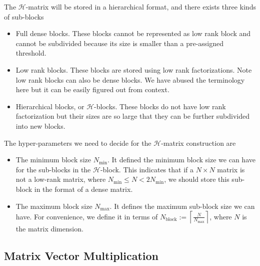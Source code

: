 \documentclass[3p,,preprint,12pt]{elsarticle}
\theoremstyle{definition}
\begin{document}
The $\mathcal{H}$-matrix will be stored in a hierarchical format, and there exists three kinds of sub-blocks
\begin{itemize}
	\item Full dense blocks. These blocks cannot be represented as low rank block and cannot be subdivided because its size is smaller than a pre-assigned threshold.
	\item Low rank blocks. These blocks are stored using low rank factorizations. Note low rank blocks can also be dense blocks. We have abused the terminology here but it can be easily figured out from context.
	\item Hierarchical blocks, or $\mathcal{H}$-blocks. These blocks do not have low rank factorization but their sizes are so large that they can be further subdivided into new blocks.
\end{itemize}
The hyper-parameters we need to decide for the $\mathcal{H}$-matrix construction are
\begin{itemize}
	\item The minimum block size $N_{\min}$. It defined the minimum block size we can have for the sub-blocks in the $\mathcal{H}$-block. This indicates that if a $N\times N$ matrix is not a low-rank matrix, where $N_{\min}\leq N< 2N_{\min}$, we should store this sub-block in the format of a dense matrix.
	\item The maximum block size $N_{\max}$. It defines the maximum sub-block size we can have. For convenience, we define it in terms of $N_{\mathrm{block}}:=\left\lceil\frac{N}{N_{\max}}\right\rceil$, where $N$ is the matrix dimension.
\end{itemize}

\subsection{Matrix Vector Multiplication}
\end{document}
